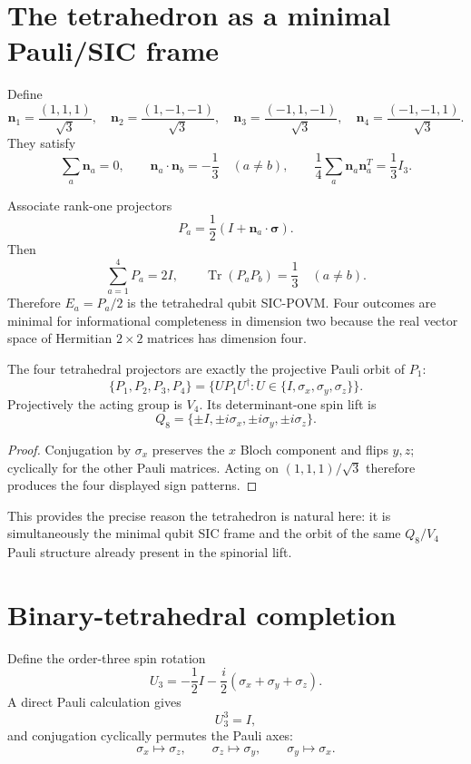 \section{The tetrahedron as a minimal Pauli/SIC frame}

Define
\[
\mathbf n_1=\frac{(1,1,1)}{\sqrt3},
\quad
\mathbf n_2=\frac{(1,-1,-1)}{\sqrt3},
\quad
\mathbf n_3=\frac{(-1,1,-1)}{\sqrt3},
\quad
\mathbf n_4=\frac{(-1,-1,1)}{\sqrt3}.
\]
They satisfy
\[
\sum_a\mathbf n_a=0,
\qquad
\mathbf n_a\cdot\mathbf n_b=-\frac13\quad(a\ne b),
\qquad
\frac14\sum_a\mathbf n_a\mathbf n_a^T=\frac13I_3.
\]

Associate rank-one projectors
\[
P_a=\frac12(I+\mathbf n_a\cdot\boldsymbol\sigma).
\]
Then
\[
\boxed{
\sum_{a=1}^4P_a=2I,
\qquad
\operatorname{Tr}(P_aP_b)=\frac13\quad(a\ne b).
}
\]
Therefore $E_a=P_a/2$ is the tetrahedral qubit SIC-POVM. Four outcomes are minimal for informational completeness in dimension two because the real vector space of Hermitian $2\times2$ matrices has dimension four.

\begin{theorem}\label{thm:pauli-orbit}
The four tetrahedral projectors are exactly the projective Pauli orbit of $P_1$:
\[
\boxed{
\{P_1,P_2,P_3,P_4\}
=
\{UP_1U^\dagger:
U\in\{I,\sigma_x,\sigma_y,\sigma_z\}\}.
}
\]
Projectively the acting group is $V_4$. Its determinant-one spin lift is
\[
Q_8=
\{\pm I,\pm i\sigma_x,\pm i\sigma_y,\pm i\sigma_z\}.
\]
\end{theorem}

\begin{proof}
Conjugation by $\sigma_x$ preserves the $x$ Bloch component and flips $y,z$; cyclically for the other Pauli matrices. Acting on $(1,1,1)/\sqrt3$ therefore produces the four displayed sign patterns.
\end{proof}

This provides the precise reason the tetrahedron is natural here: it is simultaneously the minimal qubit SIC frame and the orbit of the same $Q_8/V_4$ Pauli structure already present in the spinorial lift.

\section{Binary-tetrahedral completion}

Define the order-three spin rotation
\[
U_3
=
-\frac12 I
-\frac{i}{2}
(\sigma_x+\sigma_y+\sigma_z).
\]
A direct Pauli calculation gives
\[
U_3^3=I,
\]
and conjugation cyclically permutes the Pauli axes:
\[
\sigma_x\mapsto\sigma_z,
\qquad
\sigma_z\mapsto\sigma_y,
\qquad
\sigma_y\mapsto\sigma_x.
\]

